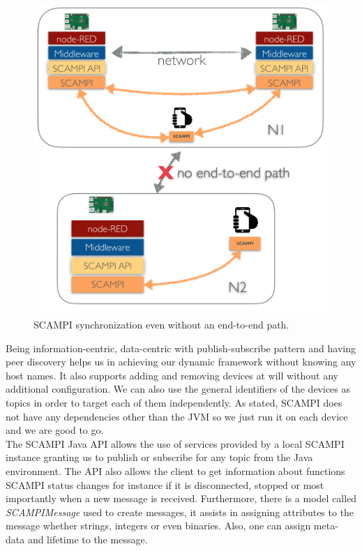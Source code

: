 \begin{figure}[H]
	\centering
	\includegraphics[scale=0.4]{images/scampi.png}
	\caption{SCAMPI synchronization even without an end-to-end path. }
	\label{fig:scampi-design}
\end{figure}

\noindent Being information-centric, data-centric with publish-subscribe pattern and having peer discovery helps us in achieving our dynamic framework without knowing any host names. It  also supports adding and removing devices at will without any additional configuration. We can also use the general identifiers of the devices as topics in order to target each of them independently. As stated, SCAMPI does not have any dependencies other than the JVM so we just run it on each device and we are  good to go. \\


\noindent The SCAMPI Java API allows the use of  services provided by a local SCAMPI instance granting us to publish or subscribe for any topic from the Java environment. The API also allows the client to get information about functions  SCAMPI status changes  for instance if it is disconnected, stopped or most importantly when a new message is received. Furthermore, there is a model called \textit{SCAMPIMessage} used to create messages, it assists in assigning attributes to the message whether strings, integers or even binaries. Also, one can assign meta-data and lifetime to the message.


